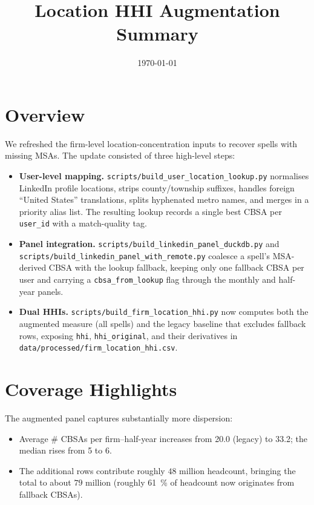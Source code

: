 \documentclass[12pt]{article}
\title{Location HHI Augmentation Summary}
\date{\today}
\begin{document}
\maketitle

\section*{Overview}
We refreshed the firm-level location-concentration inputs to recover spells with missing MSAs. The update consisted of three high-level steps:
\begin{itemize}
  \item \textbf{User-level mapping.} \texttt{scripts/build\_user\_location\_lookup.py} normalises LinkedIn profile locations, strips county/township suffixes, handles foreign ``United States'' translations, splits hyphenated metro names, and merges in a priority alias list. The resulting lookup records a single best CBSA per \texttt{user\_id} with a match-quality tag.
  \item \textbf{Panel integration.} \texttt{scripts/build\_linkedin\_panel\_duckdb.py} and \texttt{scripts/build\_linkedin\_panel\_with\_remote.py} coalesce a spell's MSA-derived CBSA with the lookup fallback, keeping only one fallback CBSA per user and carrying a \texttt{cbsa\_from\_lookup} flag through the monthly and half-year panels.
  \item \textbf{Dual HHIs.} \texttt{scripts/build\_firm\_location\_hhi.py} now computes both the augmented measure (all spells) and the legacy baseline that excludes fallback rows, exposing \texttt{hhi}, \texttt{hhi\_original}, and their derivatives in \texttt{data/processed/firm\_location\_hhi.csv}.
\end{itemize}

\section*{Coverage Highlights}
The augmented panel captures substantially more dispersion:
\begin{itemize}
  \item Average \# CBSAs per firm--half-year increases from \num{20.0} (legacy) to \num{33.2}; the median rises from 5 to 6.
  \item The additional rows contribute roughly $48$ million headcount, bringing the total to about $79$ million (roughly \SI{61}{\percent} of headcount now originates from fallback CBSAs).
\end{itemize}
\end{document}
